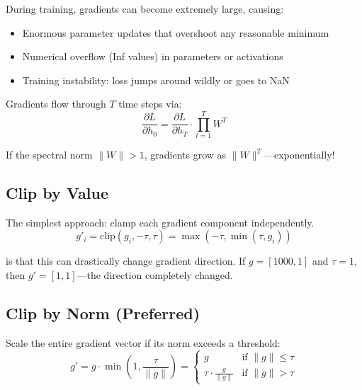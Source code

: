  During training, gradients can become extremely large, causing:
\begin{itemize}
    \item Enormous parameter updates that overshoot any reasonable minimum
    \item Numerical overflow (Inf values) in parameters or activations
    \item Training instability: loss jumps around wildly or goes to NaN
\end{itemize}


 Gradients flow through $T$ time steps via:
\begin{equation}
    \frac{\partial L}{\partial h_0} = \frac{\partial L}{\partial h_T} \cdot \prod_{t=1}^{T} W^T
\end{equation}

If the spectral norm $\|W\| > 1$, gradients grow as $\|W\|^T$---exponentially!


\subsection{Clip by Value}

The simplest approach: clamp each gradient component independently.
\begin{equation}
    g'_i = \text{clip}(g_i, -\tau, \tau) = \max(-\tau, \min(\tau, g_i))
\end{equation}

 is that this can drastically change gradient direction. If $g = [1000, 1]$ and $\tau = 1$, then $g' = [1, 1]$---the direction completely changed.


\subsection{Clip by Norm (Preferred)}

Scale the entire gradient vector if its norm exceeds a threshold:
\begin{equation}
    g' = g \cdot \min\left(1, \frac{\tau}{\|g\|}\right) = \begin{cases} g & \text{if } \|g\| \leq \tau \\ \tau \cdot \frac{g}{\|g\|} & \text{if } \|g\| > \tau \end{cases}
\end{equation}

